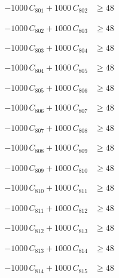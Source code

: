 \documentclass[a4paper,11pt]{article}
\begin{document}
\begin{align}
-1000\,C_{801} + 1000\,C_{802} &\geq 48 \nonumber
\end{align}

\begin{align}
-1000\,C_{802} + 1000\,C_{803} &\geq 48 \nonumber
\end{align}

\begin{align}
-1000\,C_{803} + 1000\,C_{804} &\geq 48 \nonumber
\end{align}

\begin{align}
-1000\,C_{804} + 1000\,C_{805} &\geq 48 \nonumber
\end{align}

\begin{align}
-1000\,C_{805} + 1000\,C_{806} &\geq 48 \nonumber
\end{align}

\begin{align}
-1000\,C_{806} + 1000\,C_{807} &\geq 48 \nonumber
\end{align}

\begin{align}
-1000\,C_{807} + 1000\,C_{808} &\geq 48 \nonumber
\end{align}

\begin{align}
-1000\,C_{808} + 1000\,C_{809} &\geq 48 \nonumber
\end{align}

\begin{align}
-1000\,C_{809} + 1000\,C_{810} &\geq 48 \nonumber
\end{align}

\begin{align}
-1000\,C_{810} + 1000\,C_{811} &\geq 48 \nonumber
\end{align}

\begin{align}
-1000\,C_{811} + 1000\,C_{812} &\geq 48 \nonumber
\end{align}

\begin{align}
-1000\,C_{812} + 1000\,C_{813} &\geq 48 \nonumber
\end{align}

\begin{align}
-1000\,C_{813} + 1000\,C_{814} &\geq 48 \nonumber
\end{align}

\begin{align}
-1000\,C_{814} + 1000\,C_{815} &\geq 48 \nonumber
\end{align}
\end{document}

